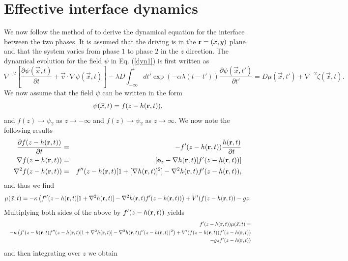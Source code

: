 \section{Effective interface dynamics}
We now follow the method of \cite{bray2001,bray2002} to derive the dynamical equation  for the interface between the two phases. It is assumed that the driving is in the ${\bf r}=(x,y)$ plane and that the system varies from phase $1$ to phase $2$ in the $z$ direction. The dynamical evolution for the field $\psi$ in Eq. (\ref{dyn1}) is first written as
\begin{equation}
\nabla^{-2}\left[\frac{\partial \psi(\vec{x},t)}{\partial t}+\vec{v}\cdot\nabla\psi(\vec{x}, t)\right] -\lambda D\int_{-\infty}^t dt'
\exp(-\alpha\lambda(t-t')) \frac{\partial \psi(\vec{x},t')}{\partial t'}=D  \mu(\vec{x},t') + \nabla^{-2} \zeta(\vec{x},t).\label{eqpsi}
\end{equation}
We now assume that the field $\psi$ can be written in the form
\begin{equation}
\psi(\vec{x},t) = f(z-h({\bf r},t)),
\end{equation}
and $f(z)\to \psi_2$ as $z\to -\infty$ and $f(z)\to \psi_2$ as  $z\to \infty$.
We now note the following results
\begin{eqnarray}
\frac{\partial f(z-h({\bf r},t))}{\partial t} &=& -f'(z-h({\bf r},t))\frac{h({\bf r},t)}{\partial t}\\
\nabla f(z-h({\bf r},t) )&=& [{\bf e}_z -\nabla h({\bf r},t)]f'(z-h({\bf r},t))]\\
\nabla^2 f(z-h({\bf r},t)) &=& f''(z-h({\bf r},t)[1 + [\nabla h({\bf r},t)]^2] -\nabla^2 h({\bf r},t)f'(z-h({\bf r},t)),
\end{eqnarray}
and thus we find
\begin{equation}
\mu(\vec{x},t)= -\kappa\left(f''(z-h({\bf r},t)[1 + \nabla^2 h({\bf r},t)] -\nabla^2 h({\bf r},t)f'(z-h({\bf r},t))\right) + V'(f(z-h({\bf r},t)) - gz .
\end{equation}
Multiplying both sides of the above by $f'(z-h({\bf r},t))$ yields
\begin{eqnarray}
&&f'(z-h({\bf r},t))\mu(\vec{x},t)=\nonumber \\
 &&-\kappa\left(f'(z-h({\bf r},t)f''(z-h({\bf r},t)[1 + \nabla^2 h({\bf r},t)] -\nabla^2 h({\bf r},t)f'(z-h({\bf r},t))^2\right) + V'(f(z-h({\bf r},t))f'(z-h({\bf r},t))\nonumber \\
 &&- gz f'(z-h({\bf r},t)) \nonumber
\end{eqnarray}
and then integrating over $z$ we obtain
